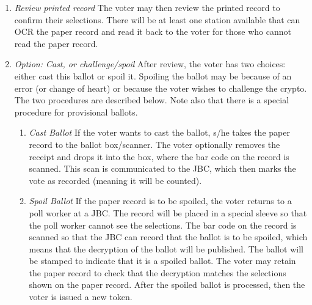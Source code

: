 \begin{enumerate}

\item {\em Review printed record}
The voter may then review the printed record to confirm their selections. There will be at least one station available that can OCR the paper record and read it back to the voter for those who cannot read the paper record.

\item {\em Option: Cast, or challenge/spoil}
After review, the voter has two choices: either cast this ballot or spoil it. Spoiling the ballot may be because of an error (or change of heart) or because the voter wishes to challenge the crypto. The two procedures are described below. Note also that there is a special procedure for provisional ballots.

\begin{enumerate}
\item  {\em Cast Ballot}
If the voter wants to cast the ballot, s/he takes the paper record to the ballot box/scanner. The voter optionally removes the receipt and drops it into the box, where the bar code on the record is scanned. This scan is communicated to the JBC, which then marks the vote as recorded (meaning it will be counted).

\item {\em Spoil Ballot}
If the paper record is to be spoiled, the voter returns to a poll worker at a JBC. The record will be placed in a special sleeve so that the poll worker cannot see the selections. The bar code on the record is scanned so that the JBC can record that the ballot is to be spoiled, which means that the decryption of the ballot will be published. The ballot will be stamped to indicate that it is a spoiled ballot. The voter may retain the paper record to check that the decryption matches the selections shown on the paper record. After the spoiled ballot is processed, then the voter is issued a new token.


\end{enumerate}
\end{enumerate}

